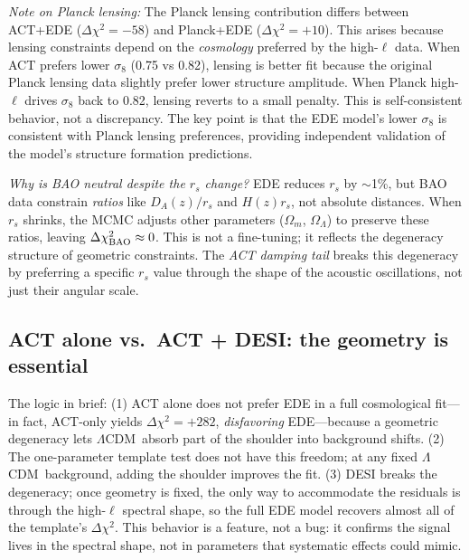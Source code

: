 \documentclass[onecolumn,showpacs,preprintnumbers,amsmath,amssymb,prd]{revtex4-2}
\newcommand{\lcdm}{$\Lambda$CDM}
\begin{document}
\emph{Note on Planck lensing:} The Planck lensing contribution differs between 
ACT+EDE ($\Delta\chi^2 = -58$) and Planck+EDE ($\Delta\chi^2 = +10$). This arises 
because lensing constraints depend on the \emph{cosmology} preferred by the 
high-$\ell$ data. When ACT prefers lower $\sigma_8$ (0.75 vs 0.82), lensing is 
better fit because the original Planck lensing data slightly prefer lower 
structure amplitude. When Planck high-$\ell$ drives $\sigma_8$ back to 0.82, 
lensing reverts to a small penalty. This is self-consistent behavior, not 
a discrepancy. The key point is that the EDE model's lower $\sigma_8$ is 
consistent with Planck lensing preferences, providing independent validation 
of the model's structure formation predictions.

\emph{Why is BAO neutral despite the $r_s$ change?} EDE reduces $r_s$ by 
$\sim$1\%, but BAO data constrain \emph{ratios} like $D_A(z)/r_s$ and 
$H(z) r_s$, not absolute distances. When $r_s$ shrinks, the MCMC adjusts 
other parameters ($\Omega_m$, $\Omega_\Lambda$) to preserve these ratios, 
leaving $\Delta\chi^2_{\rm BAO} \approx 0$. This is not a fine-tuning; it 
reflects the degeneracy structure of geometric constraints. The \emph{ACT 
damping tail} breaks this degeneracy by preferring a specific $r_s$ value 
through the shape of the acoustic oscillations, not just their angular scale.

\subsection{ACT alone vs.\ ACT + DESI: the geometry is essential}
\label{sec:act_vs_desi}

The logic in brief: (1) ACT alone does not prefer EDE in a full cosmological 
fit---in fact, ACT-only yields $\Delta\chi^2 = +282$, \emph{disfavoring} EDE---because 
a geometric degeneracy lets \lcdm\ absorb part of the shoulder into background shifts. 
(2) The one-parameter template test does not have this freedom; at any fixed \lcdm\ 
background, adding the shoulder improves the fit. (3) DESI breaks the degeneracy; 
once geometry is fixed, the only way to accommodate the residuals is through the 
high-$\ell$ spectral shape, so the full EDE model recovers almost all of the 
template's $\Delta\chi^2$. This behavior is a feature, not a bug: it confirms the 
signal lives in the spectral shape, not in parameters that systematic effects could mimic.
\end{document}
